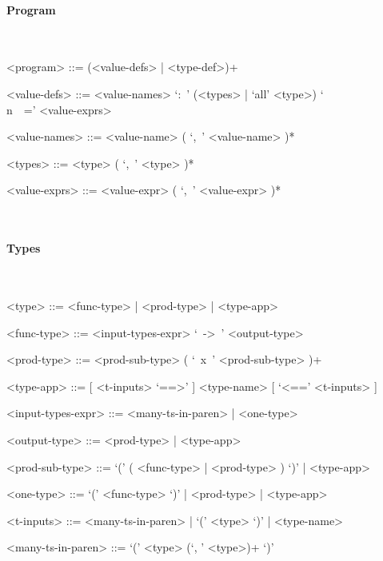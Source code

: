 \documentclass{article}
\begin{document}
\setlength{\grammarparsep}{20pt}
\setlength{\grammarindent}{12em}

\paragraph{Program}
\hspace{1cm}\\
\begin{grammar}

<program> ::= (<value-defs> | <type-def>)+

<value-defs> ::=
<value-names> `:\ ' (<types> | `all' <type>) `\\n\ \ =' <value-exprs>

<value-names> ::= <value-name> ( `,\ ' <value-name> )*  

<types> ::= <type> ( `,\ ' <type> )*  

<value-exprs> ::= <value-expr> ( `,\ ' <value-expr> )*  

\end{grammar}
\hspace{1cm}\\

\paragraph{Types}

\hspace{1cm}\\
\begin{grammar}

<type> ::= <func-type> | <prod-type> | <type-app>

<func-type> ::= <input-types-expr> `\ ->\ ' <output-type>

<prod-type> ::= <prod-sub-type> ( `\ x\ ' <prod-sub-type> )+

<type-app> ::= [ <t-inputs> `==>' ] <type-name> [ `<==' <t-inputs> ]
 
<input-types-expr> ::= <many-ts-in-paren> | <one-type>

<output-type> ::= <prod-type> | <type-app>

<prod-sub-type> ::= `(' ( <func-type> | <prod-type> ) `)' | <type-app>

<one-type> ::= `(' <func-type> `)' | <prod-type> | <type-app>

<t-inputs> ::= <many-ts-in-paren> | `(' <type> `)' | <type-name>

<many-ts-in-paren> ::=  `(' <type> (`, ' <type>)+ `)'

\end{grammar}
\end{document}
